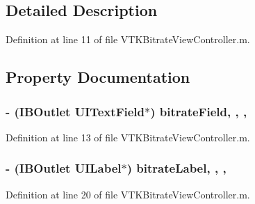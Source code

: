 \subsection{Detailed Description}


Definition at line 11 of file V\+T\+K\+Bitrate\+View\+Controller.\+m.



\subsection{Property Documentation}
\hypertarget{category_v_t_k_bitrate_view_controller_07_08_a7f677395918cd7188d58e302290c8b81}{
\subsubsection[{bitrate\+Field}]{\setlength{\rightskip}{0pt plus 5cm}-\/ (I\+B\+Outlet U\+I\+Text\+Field$\ast$) bitrate\+Field\hspace{0.3cm}{\ttfamily [read]}, {\ttfamily [write]}, {\ttfamily [nonatomic]}, {\ttfamily [weak]}}}\label{category_v_t_k_bitrate_view_controller_07_08_a7f677395918cd7188d58e302290c8b81}


Definition at line 13 of file V\+T\+K\+Bitrate\+View\+Controller.\+m.

\hypertarget{category_v_t_k_bitrate_view_controller_07_08_a347b6ac7bd388e0492406dfd9baa8585}{
\subsubsection[{bitrate\+Label}]{\setlength{\rightskip}{0pt plus 5cm}-\/ (I\+B\+Outlet U\+I\+Label$\ast$) bitrate\+Label\hspace{0.3cm}{\ttfamily [read]}, {\ttfamily [write]}, {\ttfamily [nonatomic]}, {\ttfamily [weak]}}}\label{category_v_t_k_bitrate_view_controller_07_08_a347b6ac7bd388e0492406dfd9baa8585}


Definition at line 20 of file V\+T\+K\+Bitrate\+View\+Controller.\+m.

